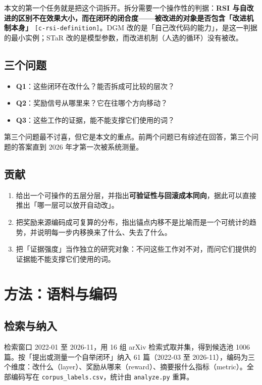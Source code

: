 本文的第一个任务就是把这个词拆开。拆分需要一个操作性的判据：\textbf{RSI 与自改进的区别不在效果大小，而在闭环的闭合度——被改进的对象是否包含「改进机制本身」} {\scriptsize\texttt{[c-\hspace{0pt}rsi-\hspace{0pt}definition]}}。DGM 改的是「自己改代码的能力」，是这一判据的最小实例；STaR 改的是模型参数，而改进机制（人选的循环）没有被改。


\subsection{三个问题}

\begin{itemize}
  \item \textbf{Q1}：这些闭环在改什么？能否拆成可比较的层次？
  \item \textbf{Q2}：奖励信号从哪里来？它在往哪个方向移动？
  \item \textbf{Q3}：这些工作的证据，能不能支撑它们使用的词？
\end{itemize}

第三个问题最不讨喜，但它是本文的重点。前两个问题已有综述在回答，第三个问题的答案直到 2026 年才第一次被系统测量。


\subsection{贡献}

\begin{enumerate}
  \item 给出一个可操作的五层分层，并指出\textbf{可验证性与回滚成本同向}，据此可以直接推出「哪一层可以放开自动改」。
  \item 把奖励来源编码成可复算的分布，指出锚点内移不是比喻而是一个可统计的趋势，并说明每一步内移换来了什么、失去了什么。
  \item 把「证据强度」当作独立的研究对象：不问这些工作对不对，而问它们提供的证据能不能支撑它们使用的词。
\end{enumerate}

\section{方法：语料与编码}

\subsection{检索与纳入}

检索窗口 2022-01 至 2026-11，用 16 组 arXiv 检索式取并集，得到候选池 1006 篇。按「提出或测量一个自举闭环」纳入 61 篇（2022-03 至 2026-11），编码为三个维度：改什么（layer）、奖励从哪来（reward）、摘要报什么指标（metric）。全部编码写在 \texttt{corpus\_labels.csv}，统计由 \texttt{analyze.py} 重算。


